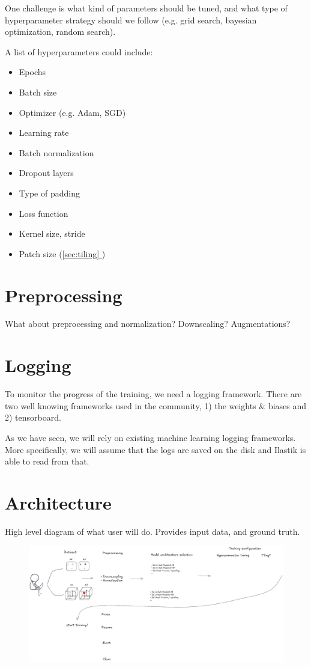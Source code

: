 \documentclass[12pt, a4paper]{article}
\newcommand*{\fullref}[1]{\hyperref[{#1}]{\ref*{#1} \nameref*{#1}}}
\begin{document}
One challenge is what kind of parameters should be tuned, and what type of hyperparameter strategy should we follow (e.g. grid search, bayesian optimization, random search).

A list of hyperparameters could include:
\begin{itemize}
    \itemsep -0.2em
    \item Epochs
    \item Batch size
    \item Optimizer (e.g. Adam, SGD)
    \item Learning rate
    \item Batch normalization
    \item Dropout layers
    \item Type of padding
    \item Loss function
    \item Kernel size, stride
    \item Patch size (\fullref{sec:tiling})
\end{itemize}



\section{Preprocessing}

What about preprocessing and normalization? Downscaling? Augmentations?


\section{Logging}

To monitor the progress of the training, we need a logging framework. There are two well knowing frameworks used in the community, 1) the weights \& biases and 2) tensorboard.


As we have seen, we will rely on existing machine learning logging frameworks. More specifically, we will assume that the logs are saved on the disk and Ilastik is able to read from that.


\section{Architecture}

High level diagram of what user will do. Provides input data, and ground truth.

\begin{figure}[h!]
    \centering
    \includegraphics[width=\textwidth]{architecture.png}
\end{figure}
\end{document}
